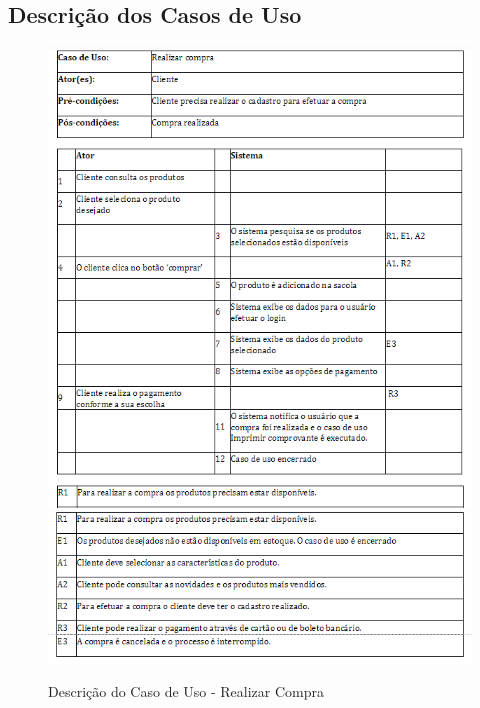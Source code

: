 \subsection{Descrição dos Casos de Uso}
\label{sec:conuso}

\begin{figure}[H]
    \centering
    \caption{Descrição do Caso de Uso -  Realizar Compra}
    \includegraphics[width=1.0\textwidth]{./dados/figuras/1}
    \includegraphics[width=1.0\textwidth]{./dados/figuras/1_2}
    \label{fig:figura-1}
\end{figure}
